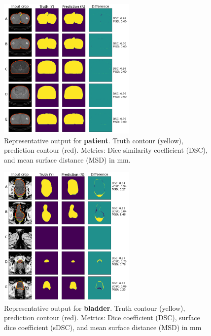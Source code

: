 \documentclass[9pt]{beamer}
\begin{document}
  \begin{frame}{}
  \begin{figure}
    \includegraphics[width=0.60\textwidth]{images/prostate_patient}
    \caption{Representative output for \textbf{patient}. Truth contour (yellow),
      prediction contour (red). Metrics: Dice similarity coefficient (DSC), and
      mean surface distance (MSD) in mm.}
  \end{figure}
\end{frame}
%
  \begin{frame}{}
  \begin{figure}
    \includegraphics[width=0.60\textwidth]{images/prostate_bladder}
    \caption{Representative output for \textbf{bladder}. Truth contour (yellow),
      prediction contour (red).
      Metrics: Dice coefficient (DSC), surface dice coefficient (sDSC), and mean
      surface distance (MSD) in mm}
  \end{figure}
\end{frame}
\end{document}
